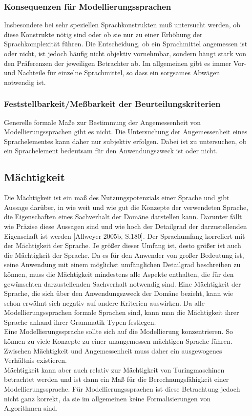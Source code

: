 \subsubsection{Konsequenzen für Modellierungssprachen}
Insbesondere bei sehr speziellen Sprachkonstrukten muß untersucht werden, ob diese Konstrukte nötig
sind oder ob sie nur zu einer Erhöhung der Sprachkomplexität führen. Die Entscheidung, ob ein
Sprachmittel angemessen ist oder nicht, ist jedoch häufig nicht objektiv vornehmbar, sondern hängt
stark von den Präferenzen der jeweiligen Betrachter ab. Im allgemeinen gibt es immer Vor- und Nachteile
für einzelne Sprachmittel, so dass ein sorgsames Abwägen notwendig ist.
\subsubsection{Feststellbarkeit/Meßbarkeit der Beurteilungskriterien} 
Generelle formale Maße zur Bestimmung der Angemessenheit von Modellierungssprachen gibt es
nicht. Die Untersuchung der Angemessenheit eines Sprachelementes kann daher nur subjektiv erfolgen.
Dabei ist zu untersuchen, ob ein Sprachelement bedeutsam für den Anwendungszweck ist oder
nicht.
\subsection{Mächtigkeit}
\label{ssc:Nutzungspotenzial}
Die Mächtigkeit ist ein maß des Nutzungspotenzials einer Sprache und gibt Aussage darüber,
in wie weit und wie gut die Konzepte der verwendeten Sprache, die Eigenschaften eines Sachverhalt der Domäne darstellen kann.
Darunter fällt wie Präzise diese Aussagen sind und wie hoch der Detailgrad der darzustellenden Eigenschaft ist werden [Allweyer 2005b, S.180].
Der Sprachumfang korreliert mit der Mächtigkeit der Sprache. Je größer dieser Umfang ist, desto größer ist auch die Mächtigkeit der Sprache.
Da es für den Anwender von großer Bedeutung ist, seine Anwendung mit einem möglichst umfänglichen Detailgrad beschreiben zu können,
muss die Mächtigkeit mindestens alle Aspekte enthalten, die für den gewünschten darzustellenden Sachverhalt notwendig sind.
Eine Mächtigkeit der Sprache, die sich über den Anwendungszweck der Domäne bezieht, kann wie schon erwähnt sich negativ auf andere Kriterien auswirken.
Da alle Modellierungssprachen formale Sprachen sind, kann man die Mächtigkeit ihrer Sprache anhand ihrer Grammatik-Typen festlegen. \\
Eine Modellierungssprache sollte sich auf die Modellierung konzentrieren.
So können zu viele Konzepte zu einer unangemessen mächtigen Sprache führen. Zwischen Mächtigkeit
und Angemessenheit muss daher ein ausgewogenes Verhältnis existieren.\\
Mächtigkeit kann aber auch relativ zur Mächtigkeit von Turingmaschinen betrachtet werden und ist
dann ein Maß für die Berechnungsfähigkeit einer Modellierungssprache. Für Modellierungssprachen
ist diese Betrachtung jedoch nicht ganz korrekt, da sie im allgemeinen keine Formalisierungen von
Algorithmen sind.
